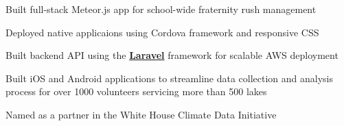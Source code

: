 \documentclass[letterpaper]{deedy-resume} %
\begin{document}
\begin{minipage}[t]{0.66\textwidth}

\begin{tightitemize}
  \item Built full-stack Meteor.js app for school-wide fraternity rush management
  \item Deployed native applicaions using Cordova framework and responsive CSS
\end{tightitemize}

\sectionspace %



\begin{tightitemize}
  \item Built backend API using the \textbf{\href{https://laravel.com/}{Laravel}} framework for scalable AWS deployment
  \item Built iOS and Android applications to streamline data collection and analysis process for over 1000 volunteers servicing more than 500 lakes
  \item Named as a partner in the White House Climate Data Initiative
\end{tightitemize}

\sectionspace %





\end{minipage}
\end{document}
